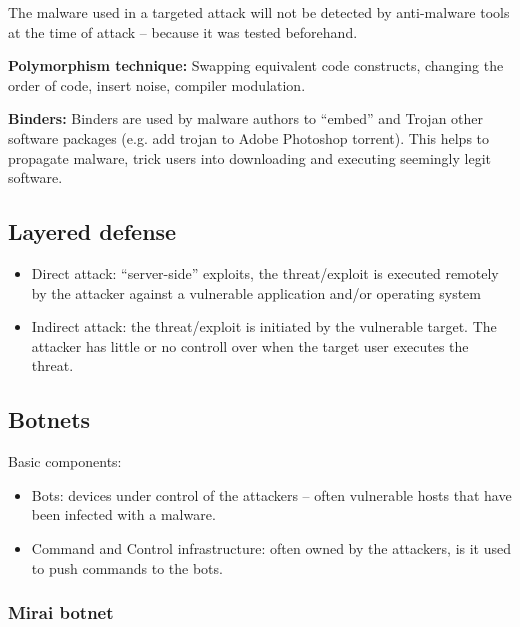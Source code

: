 \documentclass[11pt,oneside,a4paper]{article}
\begin{document}
\noindent The malware used in a targeted attack will not be detected by anti-malware tools at the time of attack – because it was tested beforehand.

\noindent \textbf{Polymorphism technique:} Swapping equivalent code constructs, changing the order of code, insert noise, compiler modulation.

\noindent \textbf{Binders:} Binders are used by malware authors to “embed” and Trojan other software packages (e.g. add trojan to Adobe Photoshop torrent). This helps to propagate malware, trick users into downloading and executing seemingly legit software. 

\subsection{Layered defense}

\vspace{-\topsep}
\begin{itemize}
	\setlength{\itemsep}{0pt}
	\setlength{\parskip}{0pt}
	\item Direct attack: “server-side” exploits, the threat/exploit is executed remotely by the attacker against a vulnerable application and/or operating system
	\item Indirect attack: the threat/exploit is initiated by the vulnerable target. The attacker has little or no controll over when the target user executes the threat.
\end{itemize}
\vspace{-\topsep}

\subsection{Botnets}

Basic components:

\vspace{-\topsep}
\begin{itemize}
	\setlength{\itemsep}{0pt}
	\setlength{\parskip}{0pt}
	\item Bots: devices under control of the attackers – often vulnerable hosts that have been
	infected with a malware.
	\item Command and Control infrastructure: often owned by the attackers, is it used to push
	commands to the bots.
\end{itemize}
\vspace{-\topsep}

\subsubsection{Mirai botnet}
\label{mirai_botnet}
\end{document}
